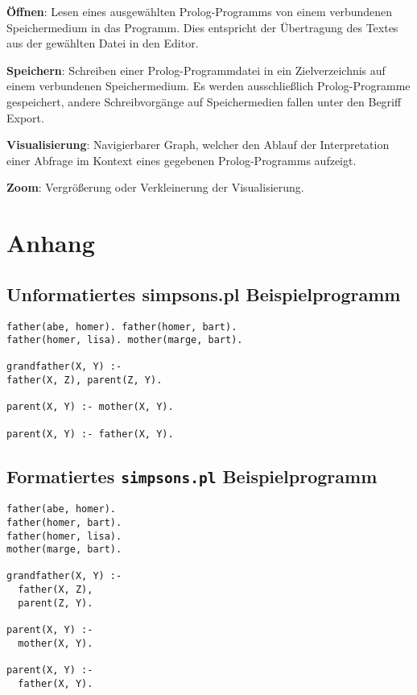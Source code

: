 \documentclass[parskip=full,11pt,twoside]{scrartcl}
\begin{document}
\textbf{Öffnen}:
Lesen eines ausgewählten Prolog-Programms von einem verbundenen Speichermedium in das Programm. Dies entspricht der Übertragung des Textes aus der gewählten Datei in den Editor.

\textbf{Speichern}:
Schreiben einer Prolog-Programmdatei in ein Zielverzeichnis auf einem verbundenen Speichermedium. Es werden ausschließlich Prolog-Programme gespeichert, andere Schreibvorgänge auf Speichermedien fallen unter den Begriff Export.

\textbf{Visualisierung}:
Navigierbarer Graph, welcher den Ablauf der Interpretation einer Abfrage im Kontext eines gegebenen Prolog-Programms aufzeigt.

\textbf{Zoom}:
Vergrößerung oder Verkleinerung der Visualisierung.

\newpage
\section{Anhang}

\subsection{Unformatiertes simpsons.pl Beispielprogramm}

\begin{lstlisting}
father(abe, homer). father(homer, bart).
father(homer, lisa). mother(marge, bart).

grandfather(X, Y) :-
father(X, Z), parent(Z, Y).

parent(X, Y) :- mother(X, Y).

parent(X, Y) :- father(X, Y).
\end{lstlisting}

\subsection{Formatiertes \texttt{simpsons.pl} Beispielprogramm}

\begin{lstlisting}
father(abe, homer).
father(homer, bart).
father(homer, lisa).
mother(marge, bart).

grandfather(X, Y) :-
  father(X, Z),
  parent(Z, Y).

parent(X, Y) :-
  mother(X, Y).

parent(X, Y) :-
  father(X, Y).
\end{lstlisting}
\end{document}
